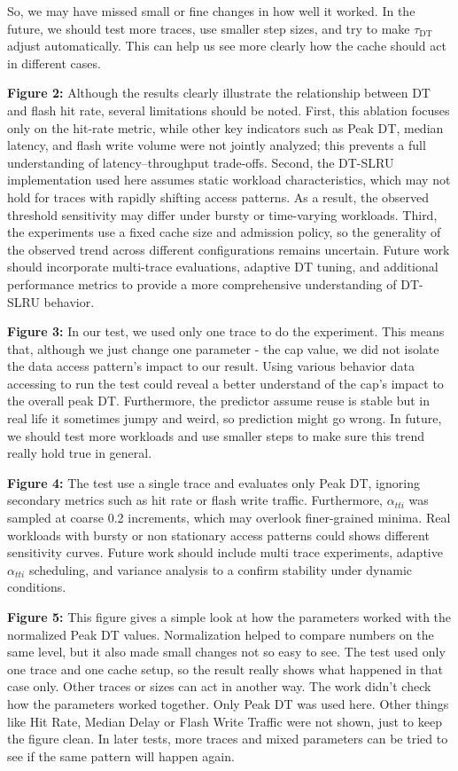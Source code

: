 So, we may have missed small or fine changes in how well it worked. In the future, we should test more traces, use smaller step sizes, and try to make $\tau_{\text{DT}}$ adjust automatically. This can help us see more clearly how the cache should act in different cases.

\textbf{Figure 2:} Although the results clearly illustrate the relationship between DT and flash hit rate, several limitations should be noted. First, this ablation focuses only on the hit-rate metric, while other key indicators such as Peak DT, median latency, and flash write volume were not jointly analyzed; this prevents a full understanding of latency–throughput trade-offs. Second, the DT-SLRU implementation used here assumes static workload characteristics, which may not hold for traces with rapidly shifting access patterns. As a result, the observed threshold sensitivity may differ under bursty or time-varying workloads. Third, the experiments use a fixed cache size and admission policy, so the generality of the observed trend across different configurations remains uncertain. Future work should incorporate multi-trace evaluations, adaptive DT tuning, and additional performance metrics to provide a more comprehensive understanding of DT-SLRU behavior.

\textbf{Figure 3:} In our test, we used only one trace to do the experiment. This means that, although we just change one parameter - the cap value, we did not isolate the data access pattern's impact to our result. Using various behavior data accessing to run the test could reveal a better understand of the cap's impact to the overall peak DT. Furthermore, the predictor assume reuse is stable but in real life it sometimes jumpy and weird, so prediction might go wrong. In future, we should test more workloads and use smaller steps to make sure this trend really hold true in general.

\textbf{Figure 4:} The test use a single trace and evaluates only Peak DT, ignoring secondary metrics such as hit rate or flash write traffic.
Furthermore, $\alpha_{tti}$ was sampled at coarse 0.2 increments, which may overlook finer-grained minima.
Real workloads with bursty or non stationary access patterns could shows different sensitivity curves.
Future work should include multi trace experiments, adaptive $\alpha_{tti}$ scheduling, and variance analysis to a confirm stability under dynamic conditions.

\textbf{Figure 5:} This figure gives a simple look at how the parameters worked with the normalized Peak DT values. Normalization helped to compare numbers on the same level, but it also made small changes not so easy to see. The test used only one trace and one cache setup, so the result really shows what happened in that case only. Other traces or sizes can act in another way. The work didn’t check how the parameters worked together. 
Only Peak DT was used here. Other things like Hit Rate, Median Delay or Flash Write Traffic were not shown, just to keep the figure clean. In later tests, more traces and mixed parameters can be tried to see if the same pattern will happen again.

